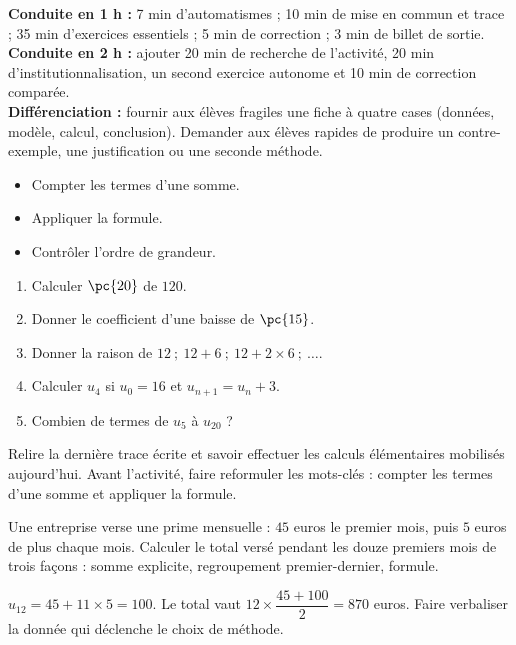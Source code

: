 \ifmxteacher
\begin{method}
\textbf{Conduite en 1 h :} 7 min d'automatismes ; 10 min de mise en commun et trace ; 35 min d'exercices essentiels ; 5 min de correction ; 3 min de billet de sortie.\\
\textbf{Conduite en 2 h :} ajouter 20 min de recherche de l'activité, 20 min d'institutionnalisation, un second exercice autonome et 10 min de correction comparée.\\
\textbf{Différenciation :} fournir aux élèves fragiles une fiche à quatre cases (données, modèle, calcul, conclusion). Demander aux élèves rapides de produire un contre-exemple, une justification ou une seconde méthode.
\end{method}
\fi
{}
\begin{objectives}\begin{itemize}\item Compter les termes d'une somme.\item Appliquer la formule.\item Contrôler l'ordre de grandeur.\end{itemize}\end{objectives}
\begin{fluency}\begin{enumerate}\item Calculer $\pc{20}$ de $120$. \item Donner le coefficient d'une baisse de $\pc{15}$. \item Donner la raison de $12\ ;\ 12+6\ ;\ 12+2\times6\ ;\ \ldots$. \item Calculer $u_4$ si $u_0=16$ et $u_{n+1}=u_n+3$. \item Combien de termes de $u_{5}$ à $u_{20}$ ? \end{enumerate}\end{fluency}
\begin{prerequisites}Relire la dernière trace écrite et savoir effectuer les calculs élémentaires mobilisés aujourd'hui. Avant l'activité, faire reformuler les mots-clés : compter les termes d'une somme et appliquer la formule.\end{prerequisites}

\begin{activity}
Une entreprise verse une prime mensuelle : $45$ euros le premier mois, puis $5$ euros de plus chaque mois. Calculer le total versé pendant les douze premiers mois de trois façons : somme explicite, regroupement premier-dernier, formule.

\end{activity}
\begin{solution}$u_{12}=45+11\times5=100$. Le total vaut $12\times\dfrac{45+100}{2}=870$ euros. Faire verbaliser la donnée qui déclenche le choix de méthode.\end{solution}

